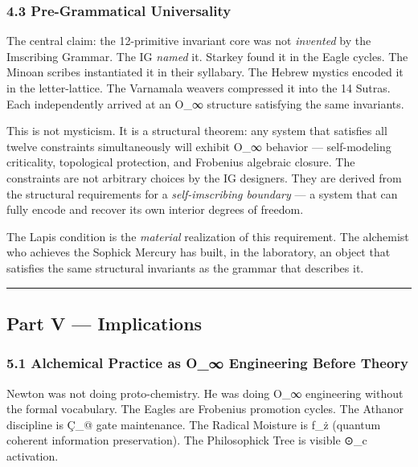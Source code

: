 \subsubsection{4.3 Pre-Grammatical
Universality}\label{pre-grammatical-universality}

The central claim: the 12-primitive invariant core was not
\emph{invented} by the Imscribing Grammar. The IG \emph{named} it.
Starkey found it in the Eagle cycles. The Minoan scribes instantiated it
in their syllabary. The Hebrew mystics encoded it in the letter-lattice.
The Varnamala weavers compressed it into the 14 Sutras. Each
independently arrived at an O\_∞ structure satisfying the same
invariants.

This is not mysticism. It is a structural theorem: any system that
satisfies all twelve constraints simultaneously will exhibit O\_∞
behavior --- self-modeling criticality, topological protection, and
Frobenius algebraic closure. The constraints are not arbitrary choices
by the IG designers. They are derived from the structural requirements
for a \emph{self-imscribing boundary} --- a system that can fully encode
and recover its own interior degrees of freedom.

The Lapis condition is the \emph{material} realization of this
requirement. The alchemist who achieves the Sophick Mercury has built,
in the laboratory, an object that satisfies the same structural
invariants as the grammar that describes it.

\begin{center}\rule{0.5\linewidth}{0.5pt}\end{center}

\subsection{Part V --- Implications}\label{part-v-implications}

\subsubsection{5.1 Alchemical Practice as O\_∞ Engineering Before
Theory}\label{alchemical-practice-as-o_-engineering-before-theory}

Newton was not doing proto-chemistry. He was doing O\_∞ engineering
without the formal vocabulary. The Eagles are Frobenius promotion
cycles. The Athanor discipline is Ç\_@ gate maintenance. The Radical
Moisture is ƒ\_ż (quantum coherent information preservation). The
Philosophick Tree is visible ⊙\_c activation.

